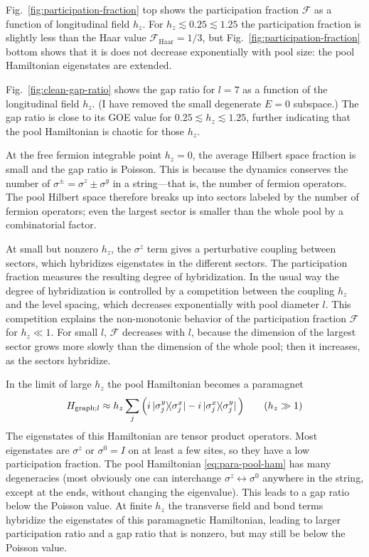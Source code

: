 \documentclass[aps,prb,nofootinbib,twocolumn,balancelastpage,amsmath,amssymb,floatfix,superscriptaddress,]{revtex4-1}
\newcommand{\ketbra}[2]{\ket {#1} \hskip -0.8ex \bra {#2}}
\newcommand{\graph}{\mathrm{graph}}
\newcommand{\Haar}{\text{Haar}}
\begin{document}
{  Fig.~\ref{fig:participation-fraction} top shows the participation fraction $\mathcal F$ as a function of longitudinal field $h_z$.
  For $h_z \lesssim 0.25 \lesssim 1.25$ the participation fraction is slightly less than the Haar value $\mathcal F_\Haar = 1/3$,
  but Fig.~\ref{fig:participation-fraction} bottom shows that it is does not decrease exponentially with pool size:
  the pool Hamiltonian eigenstates are extended.
  
  Fig.~\ref{fig:clean-gap-ratio} shows the gap ratio for $l = 7$ as a function of the longitudinal field $h_z$.
  (I have removed the small degenerate $E = 0$ subspace.)
  The gap ratio is close to its GOE value for  $0.25 \lesssim h_z \lesssim 1.25$,
  further indicating that the pool Hamiltonian is chaotic for those $h_z$.

  At the free fermion integrable point $h_z = 0$,
  the average Hilbert space fraction is small and the gap ratio is Poisson.
  This is because the dynamics conserves the number of $\sigma^{\pm} = \sigma^z \pm \sigma^y$ in a string---that is, the number of fermion operators.
  The pool Hilbert space therefore breaks up into sectors labeled by the number of fermion operators;
  even the largest sector is smaller than the whole pool by a combinatorial factor.

  At small but nonzero $h_z$, the $\sigma^z$ term gives a perturbative coupling between sectors,
  which hybridizes eigenstates in the different sectors.
  The participation fraction measures the resulting degree of hybridization.
  In the usual way the degree of hybridization is controlled by a competition between the coupling $h_z$ and the level spacing,
  which decreases exponentially with pool diameter $l$.
  This competition explains the non-monotonic behavior of the participation fraction $\mathcal F$ for $h_z \ll 1$.
  For small $l$, $\mathcal F$ decreases with $l$,
  because the dimension of the largest sector grows more slowly than the dimension of the whole pool;
  then it increases, as the sectors hybridize.

  In the limit of large $h_z$ the pool Hamiltonian becomes a paramagnet
  \begin{align}
    \label{eq:para-pool-ham}
    H_{\graph;l} \approx h_z \sum_j \Big(i\ketbra{\sigma^y_j}{\sigma^x_j} - i \ketbra{\sigma^x_j}{\sigma^y_j}\Big) \qquad (h_z \gg 1)
  \end{align}
  The eigenstates of this Hamiltonian are tensor product operators.
  Most eigenstates are $\sigma^z$ or $\sigma^0 = I$ on at least a few sites,
  so they have a low participation fraction.
  The pool Hamiltonian \eqref{eq:para-pool-ham} has many degeneracies (most obviously one can interchange $\sigma^z \leftrightarrow \sigma^0$ anywhere in the string, except at the ends, without changing the eigenvalue).
  This leads to a gap ratio below the Poisson value.
  At finite $h_z$ the transverse field and bond terms hybridize the eigenstates of this paramagnetic Hamiltonian,
  leading to larger participation ratio and a gap ratio that is nonzero, but may still be below the Poisson value.


}
\end{document}

